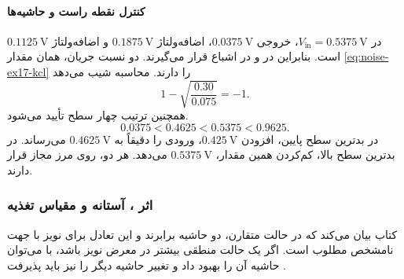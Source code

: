 \paragraph*{کنترل نقطه راست و حاشیه‌ها}
در \(V_{\mathrm{in}}=\qty{0.5375}{\volt}\)، خروجی
\(\qty{0.0375}{\volt}\)، اضافه‌ولتاژ 
\(\qty{0.1875}{\volt}\) و اضافه‌ولتاژ 
\(\qty{0.1125}{\volt}\) است.
بنابراین  در  و  در اشباع
قرار می‌گیرند. دو نسبت جریان، همان مقدار
\eqref{eq:noise-ex17-kcl} را دارند. محاسبه شیب می‌دهد
\[
 1-\sqrt{\frac{0.30}{0.075}}=-1.
\]
همچنین ترتیب چهار سطح تأیید می‌شود.
\[
 0.0375<0.4625<0.5375<0.9625.
\]
در بدترین سطح پایین، افزودن
\(\qty{0.425}{\volt}\)، ورودی را دقیقاً به
\(\qty{0.4625}{\volt}\) می‌رساند.
در بدترین سطح بالا، کم‌کردن همین مقدار،
\(\qty{0.5375}{\volt}\) می‌دهد. هر دو، روی مرز مجاز قرار دارند.

\subsubsection{اثر ، آستانه و مقیاس تغذیه}
\label{sec:noise-skew-tradeoff}
کتاب بیان می‌کند که در حالت متقارن، دو حاشیه برابرند و این
تعادل برای نویز با جهت نامشخص مطلوب است. اگر یک حالت منطقی
بیشتر در معرض نویز باشد، با  می‌توان حاشیه آن را
بهبود داد و تغییر حاشیه دیگر را نیز باید پذیرفت
\cite[صفحه ۹۲]{weste}.

